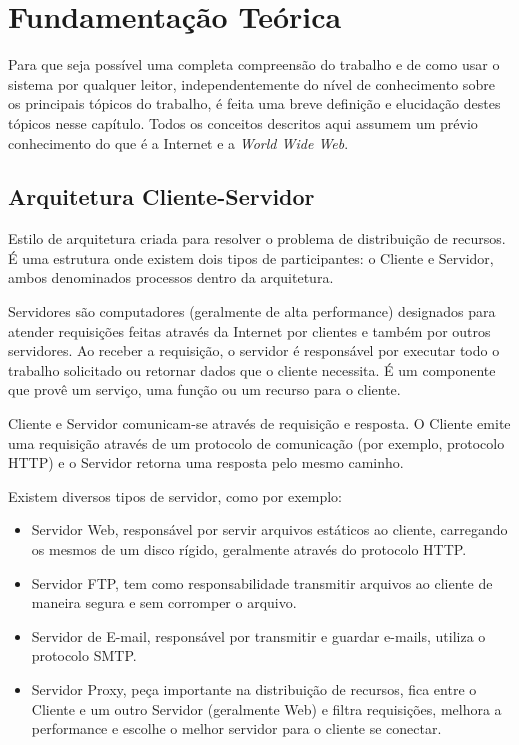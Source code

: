\chapter[Fundamentação Teórica]{Fundamentação Teórica}\label{chap:fundamentacao}

Para que seja possível uma completa compreensão do trabalho e de como usar o sistema por qualquer leitor, independentemente do nível de conhecimento sobre os principais tópicos do trabalho, é feita uma breve definição e elucidação destes tópicos nesse capítulo. Todos os conceitos descritos aqui assumem um prévio conhecimento do que é a Internet e a \textit{World Wide Web}.

\section{Arquitetura Cliente-Servidor}

Estilo de arquitetura criada para resolver o problema de distribuição de recursos. É uma estrutura onde existem dois tipos de participantes: o Cliente e Servidor, ambos denominados processos \cite{tanenbaum2002} dentro da arquitetura. 
 
Servidores são computadores (geralmente de alta performance) designados para atender requisições feitas através da Internet por clientes e também por outros servidores. Ao receber a requisição, o servidor é responsável por executar todo o trabalho solicitado ou retornar dados que o cliente necessita. É um componente que provê um serviço, uma função ou um recurso para o cliente.
 
Cliente e Servidor comunicam-se através de requisição e resposta. O Cliente emite uma requisição através de um protocolo de comunicação (por exemplo, protocolo HTTP) e o Servidor retorna uma resposta pelo mesmo caminho.
 
Existem diversos tipos de servidor, como por exemplo:
\begin{itemize}
	\item Servidor Web, responsável por servir arquivos estáticos ao cliente, carregando os mesmos de um disco rígido, geralmente através do protocolo HTTP.
    \item Servidor FTP, tem como responsabilidade transmitir arquivos ao cliente de maneira segura e sem corromper o arquivo.
    \item Servidor de E-mail, responsável por transmitir e guardar e-mails, utiliza o protocolo SMTP.
    \item Servidor Proxy, peça importante na distribuição de recursos, fica entre o Cliente e um outro Servidor (geralmente Web) e filtra requisições, melhora a performance e escolhe o melhor servidor para o cliente se conectar.
\end{itemize}
 
